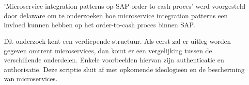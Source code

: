 
%
%

%



\chapter*{}


'Microservice integration patterns op SAP order-to-cash proces' werd voorgesteld door delaware om te onderzoeken hoe microservice integration patterns een invloed kunnen hebben op het order-to-cash proces binnen SAP. 

Dit onderzoek kent een verdiepende structuur. Als eerst zal er uitleg worden gegeven omtrent microservices, dan komt er een vergelijking tussen de verschillende onderdelen. Enkele voorbeelden hiervan zijn authenticatie en authorisatie. Deze scriptie sluit af met opkomende ideologieën en de bescherming van microservices.

